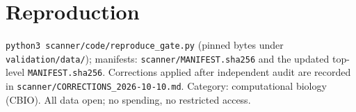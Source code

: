 \documentclass[11pt]{article}
\begin{document}
\section{Reproduction}
\texttt{python3 scanner/code/reproduce\_gate.py} (pinned bytes under
\texttt{validation/data/}); manifests: \texttt{scanner/MANIFEST.sha256} and the
updated top-level \texttt{MANIFEST.sha256}. Corrections applied after
independent audit are recorded in \texttt{scanner/CORRECTIONS\_2026-10-10.md}. Category: computational biology
(CBIO). All data open; no spending, no restricted access.
\end{document}

